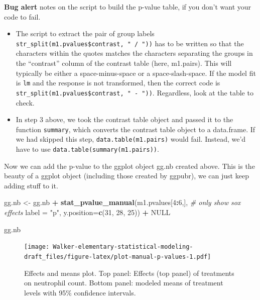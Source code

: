 \documentclass[]{book}
\newenvironment{Shaded}{\begin{snugshade}}{\end{snugshade}}
\newcommand{\CommentTok}[1]{\textcolor[rgb]{0.56,0.35,0.01}{\textit{#1}}}
\newcommand{\DataTypeTok}[1]{\textcolor[rgb]{0.13,0.29,0.53}{#1}}
\newcommand{\DecValTok}[1]{\textcolor[rgb]{0.00,0.00,0.81}{#1}}
\newcommand{\KeywordTok}[1]{\textcolor[rgb]{0.13,0.29,0.53}{\textbf{#1}}}
\newcommand{\NormalTok}[1]{#1}
\newcommand{\OperatorTok}[1]{\textcolor[rgb]{0.81,0.36,0.00}{\textbf{#1}}}
\newcommand{\OtherTok}[1]{\textcolor[rgb]{0.56,0.35,0.01}{#1}}
\newcommand{\StringTok}[1]{\textcolor[rgb]{0.31,0.60,0.02}{#1}}
\providecommand{\tightlist}{%
  \setlength{\itemsep}{0pt}\setlength{\parskip}{0pt}}
\begin{document}
\textbf{Bug alert} notes on the script to build the p-value table, if you don't want your code to fail.

\begin{itemize}
\tightlist
\item
  The script to extract the pair of group labels \texttt{str\_split(m1.pvalues\$contrast,\ "\ /\ "))} has to be written so that the characters within the quotes matches the characters separating the groups in the ``contrast'' column of the contrast table (here, m1.pairs). This will typically be either a space-minus-space or a space-slash-space. If the model fit is \texttt{lm} and the response is not transformed, then the correct code is \texttt{str\_split(m1.pvalues\$contrast,\ "\ -\ "))}. Regardless, look at the table to check.
\item
  In step 3 above, we took the contrast table object and passed it to the function \texttt{summary}, which converts the contrast table object to a data.frame. If we had skipped this step, \texttt{data.table(m1.pairs)} would fail. Instead, we'd have to use \texttt{data.table(summary(m1.pairs))}.
\end{itemize}

Now we can add the p-value to the ggplot object gg.nb created above. This is the beauty of a ggplot object (including those created by ggpubr), we can just keep adding stuff to it.

\begin{Shaded}
\begin{Highlighting}[]
\NormalTok{gg.nb <-}\StringTok{ }\NormalTok{gg.nb }\OperatorTok{+}
\StringTok{    }\KeywordTok{stat_pvalue_manual}\NormalTok{(m1.pvalues[}\DecValTok{4}\OperatorTok{:}\DecValTok{6}\NormalTok{,], }\CommentTok{# only show sox effects}
                           \DataTypeTok{label =} \StringTok{"p"}\NormalTok{, }
                           \DataTypeTok{y.position=}\KeywordTok{c}\NormalTok{(}\DecValTok{31}\NormalTok{, }\DecValTok{28}\NormalTok{, }\DecValTok{25}\NormalTok{)) }\OperatorTok{+}
\StringTok{  }\OtherTok{NULL}

\NormalTok{gg.nb}
\end{Highlighting}
\end{Shaded}

\begin{figure}
\centering
\texttt{[image: Walker-elementary-statistical-modeling-draft\_files/figure-latex/plot-manual-p-values-1.pdf]}
\caption{\label{fig:plot-manual-p-values}Effects and means plot. Top panel: Effects (top panel) of treatments on neutrophil count. Bottom panel: modeled means of treatment levels with 95\% confidence intervals.}
\end{figure}
\end{document}
